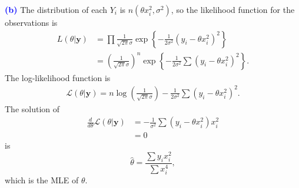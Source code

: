 \documentclass[12pt]{article}
\begin{document}
\noindent \textcolor{blue}{\textbf{(b)}} The distribution of each $Y_i$ is $n(\theta x_i^2, \sigma^2)$, so the likelihood function for the observations is
\begin{align}
L(\theta|\textbf{y}) &= \prod \frac{1}{\sqrt{2\pi}\sigma}\exp\left\lbrace -\frac{1}{2\sigma^2}(y_i - \theta x_i^2)^2\right\rbrace \\
&= \left(\frac{1}{\sqrt{2\pi}\sigma}\right)^n\exp\left\lbrace -\frac{1}{2\sigma^2}\sum(y_i - \theta x_i^2)^2\right\rbrace.
\end{align}
The log-likelihood function is 
\begin{align}
\mathscr{L}(\theta|\textbf{y}) = n\log\left(\frac{1}{\sqrt{2\pi}\sigma}\right) - \frac{1}{2\sigma^2}\sum (y_i-\theta x_i^2)^2.
\end{align}
The solution of
\begin{align}
\frac{d}{d\theta}\mathscr{L}(\theta | \textbf{y}) &= -\frac{1}{\sigma^2}\sum(y_i-\theta x_i^2)x_i^2 \\
&= 0
\end{align}
is $$\hat{\theta} = \frac{\sum y_i x_i^2}{\sum x_i^4},$$ which is the MLE of $\theta$. 

\vspace{3mm}
\end{document}
